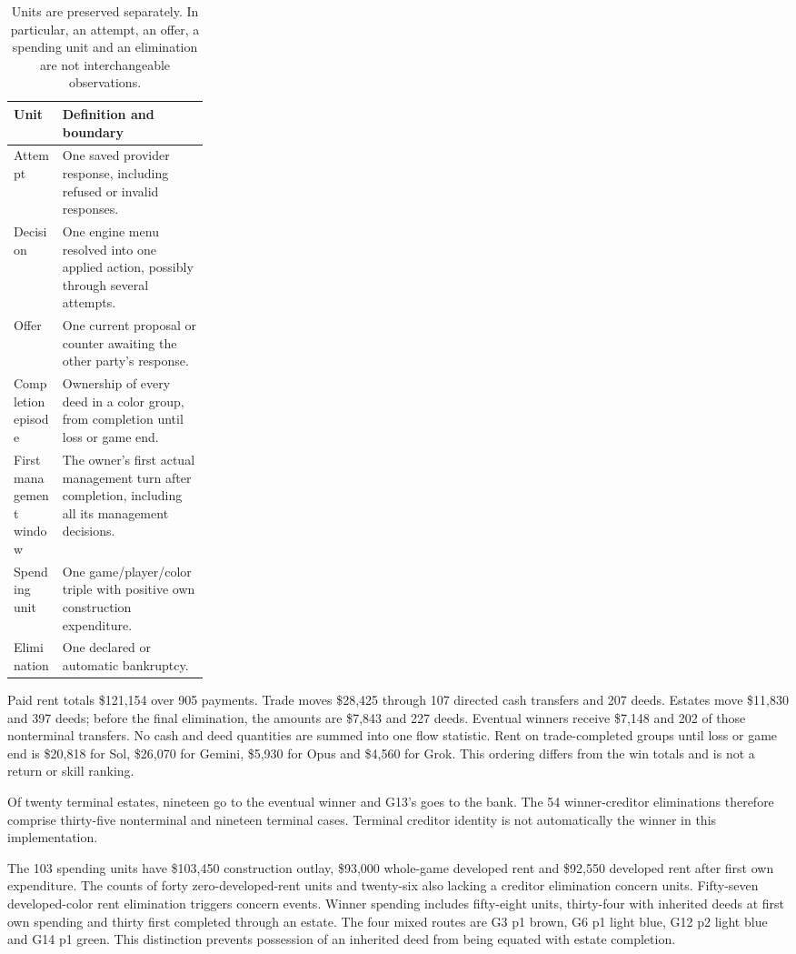 \begin{table}[htbp]
\centering\small
\begin{tabularx}{\linewidth}{@{}L{0.25\linewidth}Y@{}}
\toprule
Unit & Definition and boundary\\
\midrule
Attempt & One saved provider response, including refused or invalid responses.\\
Decision & One engine menu resolved into one applied action, possibly through several attempts.\\
Offer & One current proposal or counter awaiting the other party's response.\\
Completion episode & Ownership of every deed in a color group, from completion until loss or game end.\\
First management window & The owner's first actual management turn after completion, including all its management decisions.\\
Spending unit & One game/player/color triple with positive own construction expenditure.\\
Elimination & One declared or automatic bankruptcy.\\
\bottomrule
\end{tabularx}
\caption{Units are preserved separately. In particular, an attempt, an offer, a spending unit and an elimination are not interchangeable observations.}
\end{table}

Paid rent totals \$121,154 over 905 payments. Trade moves \$28,425 through 107 directed cash transfers and 207 deeds. Estates move \$11,830 and 397 deeds; before the final elimination, the amounts are \$7,843 and 227 deeds. Eventual winners receive \$7,148 and 202 of those nonterminal transfers. No cash and deed quantities are summed into one flow statistic. Rent on trade-completed groups until loss or game end is \$20,818 for Sol, \$26,070 for Gemini, \$5,930 for Opus and \$4,560 for Grok. This ordering differs from the win totals and is not a return or skill ranking.

Of twenty terminal estates, nineteen go to the eventual winner and G13's goes to the bank. The 54 winner-creditor eliminations therefore comprise thirty-five nonterminal and nineteen terminal cases. Terminal creditor identity is not automatically the winner in this implementation.

The 103 spending units have \$103,450 construction outlay, \$93,000 whole-game developed rent and \$92,550 developed rent after first own expenditure. The counts of forty zero-developed-rent units and twenty-six also lacking a creditor elimination concern units. Fifty-seven developed-color rent elimination triggers concern events. Winner spending includes fifty-eight units, thirty-four with inherited deeds at first own spending and thirty first completed through an estate. The four mixed routes are G3 p1 brown, G6 p1 light blue, G12 p2 light blue and G14 p1 green. This distinction prevents possession of an inherited deed from being equated with estate completion.

